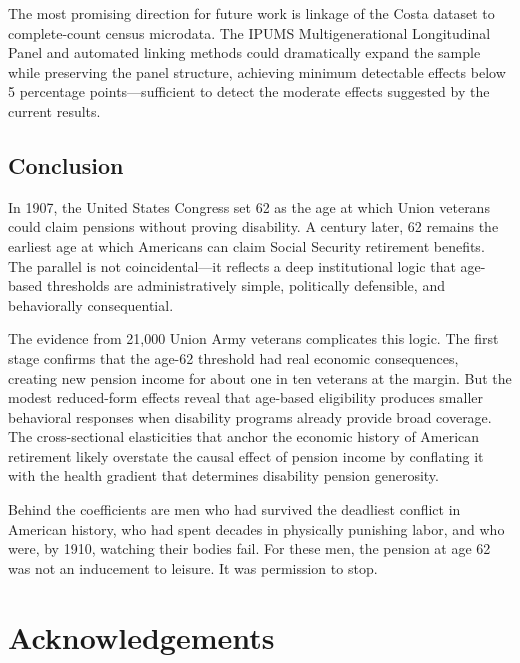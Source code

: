 \documentclass[12pt]{article}
\begin{document}
The most promising direction for future work is linkage of the Costa dataset to complete-count census microdata. The IPUMS Multigenerational Longitudinal Panel \citep{ruggles2024mlp} and automated linking methods \citep{abramitzky2021automated} could dramatically expand the sample while preserving the panel structure, achieving minimum detectable effects below 5 percentage points---sufficient to detect the moderate effects suggested by the current results.

\subsection{Conclusion}

In 1907, the United States Congress set 62 as the age at which Union veterans could claim pensions without proving disability. A century later, 62 remains the earliest age at which Americans can claim Social Security retirement benefits. The parallel is not coincidental---it reflects a deep institutional logic that age-based thresholds are administratively simple, politically defensible, and behaviorally consequential.

The evidence from 21,000 Union Army veterans complicates this logic. The first stage confirms that the age-62 threshold had real economic consequences, creating new pension income for about one in ten veterans at the margin. But the modest reduced-form effects reveal that age-based eligibility produces smaller behavioral responses when disability programs already provide broad coverage. The cross-sectional elasticities that anchor the economic history of American retirement likely overstate the causal effect of pension income by conflating it with the health gradient that determines disability pension generosity.

Behind the coefficients are men who had survived the deadliest conflict in American history, who had spent decades in physically punishing labor, and who were, by 1910, watching their bodies fail. For these men, the pension at age 62 was not an inducement to leisure. It was permission to stop.

\section*{Acknowledgements}
\end{document}
